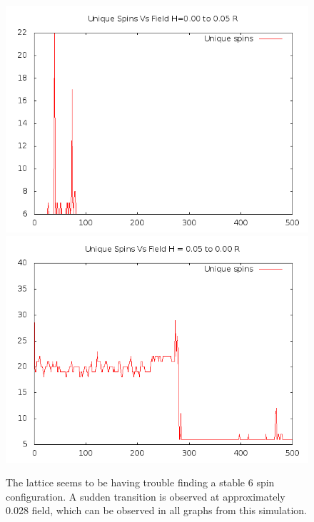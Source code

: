 \documentclass{article}
\begin{document}
\begin{figure}[ht]
\centering
\includegraphics[scale=0.5]{110/000to005RFreq.png}
\includegraphics[scale=0.5]{110/005to000RFreq.png}
\caption{The lattice seems to be having trouble finding a stable 6 spin configuration. A sudden transition is observed
at approximately 0.028 field, which can be observed in all graphs from this simulation.}
\end{figure}
\clearpage
\end{document}
